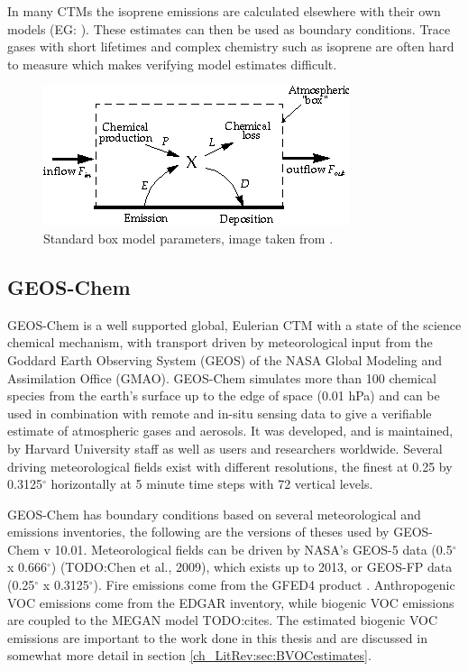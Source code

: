     In many CTMs the isoprene emissions are calculated elsewhere with their own models (EG: \citet{Guenther2006}).
    These estimates can then be used as boundary conditions.
    Trace gases with short lifetimes and complex chemistry such as isoprene are often hard to measure which makes verifying model estimates difficult.

    \begin{figure}
      \includegraphics{Figures/boxmodel.png}
      \caption{ Standard box model parameters, image taken from \citet{Jacob_1999_book}. }
      \label{ch_LitRev:fig:boxmodel}
    \end{figure}

  \subsection{GEOS-Chem}
  
    GEOS-Chem is a well supported global, Eulerian CTM with a state of the science chemical mechanism, with transport driven by meteorological input from the Goddard Earth Observing System (GEOS) of the NASA Global Modeling and Assimilation Office (GMAO).
    GEOS-Chem simulates more than 100 chemical species from the earth's surface up to the edge of space (0.01 hPa) and can be used in combination with remote and in-situ sensing data to give a verifiable estimate of atmospheric gases and aerosols.
    It was developed, and is maintained, by Harvard University staff as well as users and researchers worldwide. 
    Several driving meteorological fields exist with different resolutions, the finest at 0.25 by 0.3125$^\circ$ horizontally at 5 minute time steps with 72 vertical levels.
    
   GEOS-Chem has boundary conditions based on several meteorological and emissions inventories, the following are the versions of theses used by GEOS-Chem v 10.01. 
   Meteorological fields can be driven by NASA's GEOS-5 data (0.5$^{\circ}$ x 0.666$^{\circ}$) (TODO:Chen et al., 2009), which exists up to 2013, or GEOS-FP data (0.25$^{\circ}$ x 0.3125$^{\circ}$).
   Fire emissions come from the GFED4 product \citep{Giglio2013}. Anthropogenic VOC emissions come from the EDGAR inventory, while biogenic VOC emissions are coupled to the MEGAN model TODO:cites.
   The estimated biogenic VOC emissions are important to the work done in this thesis and are discussed in somewhat more detail in section \ref{ch_LitRev:sec:BVOCestimates}.

